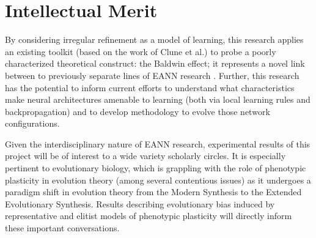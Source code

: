 \section{Intellectual Merit}
By considering irregular refinement as a model of learning, this research applies an existing toolkit (based on the work of Clune et al.) to probe a poorly characterized theoretical construct: the Baldwin effect; it represents a novel link between to previously separate lines of EANN research \autocite{Clune2011OnRegularity,Downing2010TheNetworks}. Further, this research has the potential to inform current efforts to understand what characteristics make neural architectures amenable to learning (both via local learning rules and backpropagation) and to develop methodology to evolve those network configurations.

Given the interdisciplinary nature of EANN research, experimental results of this project will be of interest to a wide variety scholarly circles. It is especially pertinent to evolutionary biology, which is grappling with the role of phenotypic plasticity in evolution theory (among several contentious issues) as it undergoes a paradigm shift in evolution theory from the Modern Synthesis to the Extended Evolutionary Synthesis\autocite{Pigliucci2008IsEvolvable}. Results describing evolutionary bias induced by representative and elitist models of phenotypic plasticity will directly inform these important conversations. 


